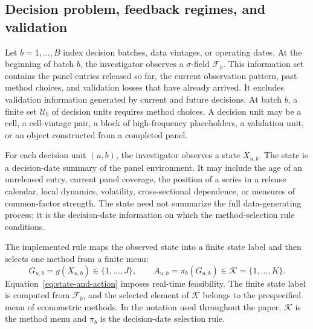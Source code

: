 \documentclass[a4paper, 12pt]{article}
\theoremstyle{plain}
\theoremstyle{remark}
\newcommand{\Kcal}{\mathcal{K}}
\newcommand{\Ucal}{\mathcal{U}}
\newcommand{\Fcal}{\mathcal{F}}
\newcommand{\1}{\mathbf{1}}
\begin{document}
\subsection{Decision problem, feedback regimes, and validation}

Let \(b=1,\ldots,B\) index decision batches, data vintages, or operating dates. At the beginning of batch \(b\), the investigator observes a \(\sigma\)-field \(\Fcal_b\). This information set contains the panel entries released so far, the current observation pattern, past method choices, and validation losses that have already arrived. It excludes validation information generated by current and future decisions. At batch \(b\), a finite set \(\Ucal_b\) of decision units requires method choices. A decision unit may be a cell, a cell-vintage pair, a block of high-frequency placeholders, a validation unit, or an object constructed from a completed panel.

For each decision unit \((u,b)\), the investigator observes a state \(X_{u,b}\). The state is a decision-date summary of the panel environment. It may include the age of an unreleased entry, current panel coverage, the position of a series in a release calendar, local dynamics, volatility, cross-sectional dependence, or measures of common-factor strength. The state need not summarize the full data-generating process; it is the decision-date information on which the method-selection rule conditions.

The implemented rule maps the observed state into a finite state label and then selects one method from a finite menu:
\begin{equation}
\label{eq:state-and-action}
    G_{u,b}=g(X_{u,b})\in\{1,\ldots,J\},
    \qquad
    A_{u,b}=\pi_b(G_{u,b})\in\Kcal=\{1,\ldots,K\} .
\end{equation}
Equation~\eqref{eq:state-and-action} imposes real-time feasibility. The finite state label is computed from \(\Fcal_b\), and the selected element of \(\Kcal\) belongs to the prespecified menu of econometric methods. In the notation used throughout the paper, \(\Kcal\) is the method menu and \(\pi_b\) is the decision-date selection rule.
\end{document}
